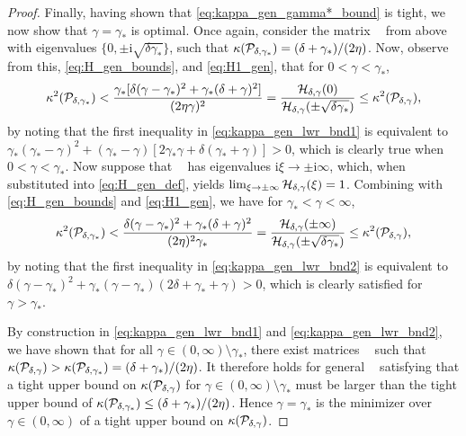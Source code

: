 \documentclass[review]{siamart}
\DeclareMathOperator{\cL}{\widehat{\mathcal{L}}}
\begin{document}
\begin{proof}
Finally, having shown that \eqref{eq:kappa_gen_gamma*_bound} is tight, we now show that 
$\gamma = \gamma_*$ is optimal. Once again, consider the matrix $\cL$ from above
with eigenvalues $\{0, \pm \mathrm{i}\sqrt{\delta \gamma_*} \}$, such that
$\kappa({\cal P}_{\delta,\gamma_*})
=
(\delta + \gamma_*)/(2\eta)$. Now, observe from this, \eqref{eq:H_gen_bounds},
and \eqref{eq:H1_gen}, that for $0 < \gamma < \gamma_*$,
%
\begin{align}
\label{eq:kappa_gen_lwr_bnd1}
\kappa^2({\cal P}_{\delta,\gamma_*})
<
\frac{\gamma_*[\delta(\gamma - \gamma_*)^2 + \gamma_*(\delta + \gamma)^2]}{(2 \eta \gamma)^2}
=
\frac{{\cal H}_{\delta,\gamma}(0)}{{\cal H}_{\delta,\gamma}(\pm \sqrt{\delta \gamma_*})}
\leq
\kappa^2({\cal P}_{\delta,\gamma}),
\end{align}
by noting that the first inequality in \eqref{eq:kappa_gen_lwr_bnd1} is equivalent to 
$\gamma_*(\gamma_* - \gamma)^2 + (\gamma_* - \gamma) [2 \gamma_*  \gamma + \delta(\gamma_* + \gamma)] > 0$, which is clearly true when $0 < \gamma < \gamma_*$.
Now suppose that $\cL$ has eigenvalues $\mathrm{i} \xi \to \pm \mathrm{i} \infty$,
which, when substituted into \eqref{eq:H_gen_def}, yields
$\lim_{\xi \to \pm \infty} {\cal H}_{\delta,\gamma}(\xi) = 1$.
Combining with \eqref{eq:H_gen_bounds} and \eqref{eq:H1_gen}, we have 
for $\gamma_* < \gamma < \infty$,
%
\begin{align}
\label{eq:kappa_gen_lwr_bnd2}
\kappa^2({\cal P}_{\delta,\gamma_*})
< 
\frac{\delta(\gamma - \gamma_*)^2 + \gamma_*(\delta + \gamma)^2}{(2 \eta )^2 \gamma_*}
=
\frac{{\cal H}_{\delta,\gamma}(\pm \infty)}{{\cal H}_{\delta,\gamma}(\pm \sqrt{\delta \gamma_*})}
\leq
\kappa^2({\cal P}_{\delta,\gamma}),
\end{align}
by noting that the first inequality in \eqref{eq:kappa_gen_lwr_bnd2} is equivalent to 
$\delta (\gamma - \gamma_*)^2 + \gamma_*(\gamma - \gamma_*) (2 \delta + \gamma_* + \gamma) > 0$, which is clearly satisfied for $\gamma > \gamma_*$.
%

By construction in \eqref{eq:kappa_gen_lwr_bnd1} and \eqref{eq:kappa_gen_lwr_bnd2},
we have shown that for all $\gamma \in (0, \infty) \setminus \gamma_*$, there exist
matrices $\cL$ such that $\kappa({\cal P}_{\delta,\gamma}) > \kappa({\cal
P}_{\delta,\gamma_*}) = (\delta + \gamma_*)/(2\eta)$. It therefore holds for general $\cL$
satisfying  that a tight upper bound on $\kappa({\cal P}_{\delta,\gamma})$
for $\gamma \in (0, \infty) \setminus \gamma_*$ must be larger than the tight upper
bound of $\kappa({\cal P}_{\delta,\gamma_*}) \leq (\delta + \gamma_*)/(2\eta)$. Hence $\gamma=\gamma_*$ is the
minimizer over $\gamma \in (0, \infty)$ of a tight upper bound on $\kappa({\cal
P}_{\delta,\gamma})$.
\end{proof}
%
\end{document}

